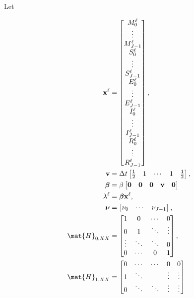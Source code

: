 \documentclass{jpmarticle}
\renewcommand{\vec}[1]{\boldsymbol{\mathrm{#1}}}
\let\subequationsorig\subequations%
\let\endsubequationsorig\endsubequations%
\renewenvironment{subequations}{
  \subequationsorig
  \renewcommand{\theequation}{\theparentequation.\arabic{equation}}
}{
  \endsubequationsorig
}
\begin{document}
Let
\begin{subequations}
  \begin{align}
    \vec{x}^{\ell} &=
    \begin{bmatrix}
      M_0^{\ell} \\ \vdots \\ M_{J - 1}^{\ell} \\
      S_0^{\ell} \\ \vdots \\ S_{J - 1}^{\ell} \\
      E_0^{\ell} \\ \vdots \\ E_{J - 1}^{\ell} \\
      I_0^{\ell} \\ \vdots \\ I_{J - 1}^{\ell} \\
      R_0^{\ell} \\ \vdots \\ R_{J - 1}^{\ell}
    \end{bmatrix},
    \\
    \vec{v} &=
    \Delta t
    \begin{bmatrix}
      \frac{1}{2} & 1 & \cdots & 1 & \frac{1}{2}
    \end{bmatrix},
    \\
    \vec{\beta} &=
    \beta
    \begin{bmatrix}
      \vec{0} & \vec{0} & \vec{0} & \vec{v} & \vec{0}
    \end{bmatrix}
    \\
    \lambda^{\ell} &=
    \vec{\beta} \vec{x}^{\ell},
    \\
    \vec{\nu} &=
    \begin{bmatrix}
      \nu_0 & \cdots & \nu_{J - 1}
    \end{bmatrix},
    \\
    \mat{H}_{0, XX} &=
    \begin{bmatrix}
      1 & 0 & \cdots & 0 \\
      0 & 1 & \ddots & \vdots \\
      \vdots & \ddots & \ddots & 0 \\
      0 & \cdots & 0 & 1
    \end{bmatrix},
    \\
    \mat{H}_{1, XX} &=
    \begin{bmatrix}
      0 & \cdots & \cdots & 0 & 0 \\
      1 & \ddots & & \vdots & \vdots \\
      0 & \ddots & \ddots & \vdots & \vdots \\

\end{bmatrix}
\end{align}
\end{subequations}
\end{document}
